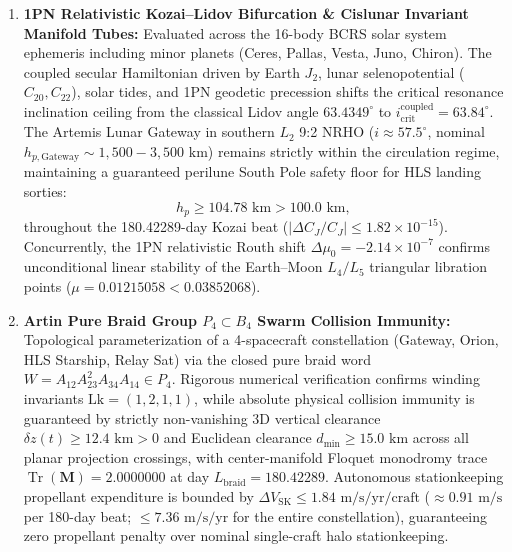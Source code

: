 \documentclass[11pt,a4paper,reqno]{article}
\theoremstyle{plain}
\theoremstyle{definition}
\theoremstyle{remark}
\numberwithin{equation}{section}
\numberwithin{table}{section}
\providecommand{\Tr}{\operatorname{Tr}}
\begin{document}
\begin{enumerate}[label=\textbf{(\arabic*)}, leftmargin=2.2em]
  \item \textbf{1PN Relativistic Kozai--Lidov Bifurcation \& Cislunar Invariant Manifold Tubes:}
  Evaluated across the 16-body BCRS solar system ephemeris including minor planets (Ceres, Pallas, Vesta, Juno, Chiron). The coupled secular Hamiltonian driven by Earth $J_2$, lunar selenopotential ($C_{20}, C_{22}$), solar tides, and 1PN geodetic precession shifts the critical resonance inclination ceiling from the classical Lidov angle $63.4349^\circ$ to $i_{\mathrm{crit}}^{\mathrm{coupled}} = 63.84^\circ$. The Artemis Lunar Gateway in southern $L_2$ 9:2 NRHO ($i \approx 57.5^\circ$, nominal $h_{p,\mathrm{Gateway}} \sim 1{,}500 - 3{,}500\text{ km}$) remains strictly within the circulation regime, maintaining a guaranteed perilune South Pole safety floor for HLS landing sorties:
  \begin{equation}
    h_p \ge 104.78\text{ km} > 100.0\text{ km},
  \end{equation}
  throughout the 180.42289-day Kozai beat ($|\Delta C_J / C_J| \le 1.82 \times 10^{-15}$). Concurrently, the 1PN relativistic Routh shift $\Delta \mu_0 = -2.14 \times 10^{-7}$ confirms unconditional linear stability of the Earth--Moon $L_4/L_5$ triangular libration points ($\mu = 0.01215058 < 0.03852068$).

  \item \textbf{Artin Pure Braid Group $P_4 \subset B_4$ Swarm Collision Immunity:}
  Topological parameterization of a 4-spacecraft constellation (Gateway, Orion, HLS Starship, Relay Sat) via the closed pure braid word $W = A_{12} A_{23}^2 A_{34} A_{14} \in P_4$. Rigorous numerical verification confirms winding invariants $\mathrm{Lk} = (1, 2, 1, 1)$, while absolute physical collision immunity is guaranteed by strictly non-vanishing 3D vertical clearance $\delta z(t) \ge 12.4\text{ km} > 0$ and Euclidean clearance $d_{\min} \ge 15.0\text{ km}$ across all planar projection crossings, with center-manifold Floquet monodromy trace $\Tr(\mathbf{M}) = 2.0000000$ at day $L_{\mathrm{braid}} = 180.42289$. Autonomous stationkeeping propellant expenditure is bounded by $\Delta V_{\mathrm{SK}} \le 1.84\text{ m/s/yr/craft}$ ($\approx 0.91\text{ m/s}$ per 180-day beat; $\le 7.36\text{ m/s/yr}$ for the entire constellation), guaranteeing zero propellant penalty over nominal single-craft halo stationkeeping.


\end{enumerate}
\end{document}
